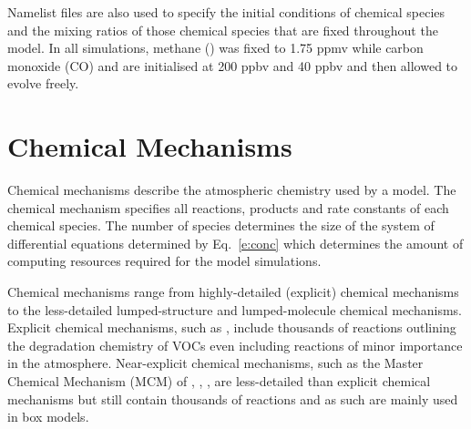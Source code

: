 Namelist files are also used to specify the initial conditions of chemical species and the mixing ratios of those chemical species that are fixed throughout the model.
In all simulations, methane () was fixed to 1.75 ppmv while carbon monoxide (CO) and  are initialised at 200 ppbv and 40 ppbv and then allowed to evolve freely.

\section{Chemical Mechanisms} \label{s:chemical_mechanisms}
Chemical mechanisms describe the atmospheric chemistry used by a model.
The chemical mechanism specifies all reactions, products and rate constants of each chemical species.  
The number of species determines the size of the system of differential equations determined by Eq.~\eqref{e:conc} which determines the amount of computing resources required for the model simulations.

Chemical mechanisms range from highly-detailed (explicit) chemical mechanisms to the less-detailed lumped-structure and lumped-molecule chemical mechanisms.
Explicit chemical mechanisms, such as \citet{Aumont:2005}, include thousands of reactions outlining the degradation chemistry of VOCs even including reactions of minor importance in the atmosphere.
Near-explicit chemical mechanisms, such as the Master Chemical Mechanism (MCM) of \citet{Jenkin:1997}, \citet{Jenkin:2003}, \citet{Saunders:2003}, \citet{Bloss:2005} are less-detailed than explicit chemical mechanisms but still contain thousands of reactions and as such are mainly used in box models.

